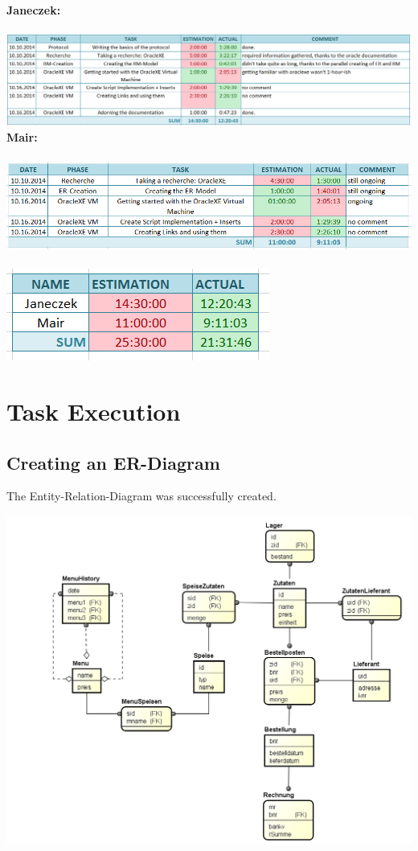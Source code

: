 \documentclass[11pt,a4paper]{article}
\begin{document}
\textbf{Janeczek:} \\ \\
\includegraphics{wh-chris}
\textbf{Mair:} \\ \\
\includegraphics{wh-wolfi} \\ \\
\includegraphics{wh-sum}

\newpage
\section{Task Execution}
\subsection{Creating an ER-Diagram}
The Entity-Relation-Diagram was successfully created.

\includegraphics[scale=0.5]{dist-db-ERD}
\end{document}
